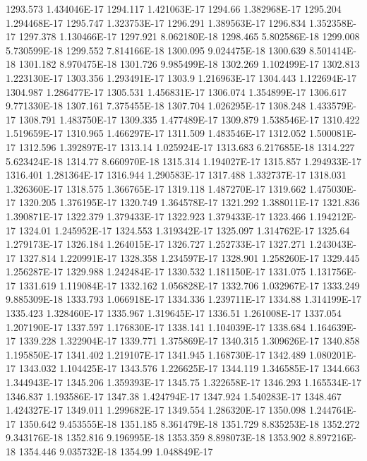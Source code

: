 1293.573  1.434046E-17
1294.117  1.421063E-17
1294.66  1.382968E-17
1295.204  1.294468E-17
1295.747  1.323753E-17
1296.291  1.389563E-17
1296.834  1.352358E-17
1297.378  1.130466E-17
1297.921  8.062180E-18
1298.465  5.802586E-18
1299.008  5.730599E-18
1299.552  7.814166E-18
1300.095  9.024475E-18
1300.639  8.501414E-18
1301.182  8.970475E-18
1301.726  9.985499E-18
1302.269  1.102499E-17
1302.813  1.223130E-17
1303.356  1.293491E-17
1303.9  1.216963E-17
1304.443  1.122694E-17
1304.987  1.286477E-17
1305.531  1.456831E-17
1306.074  1.354899E-17
1306.617  9.771330E-18
1307.161  7.375455E-18
1307.704  1.026295E-17
1308.248  1.433579E-17
1308.791  1.483750E-17
1309.335  1.477489E-17
1309.879  1.538546E-17
1310.422  1.519659E-17
1310.965  1.466297E-17
1311.509  1.483546E-17
1312.052  1.500081E-17
1312.596  1.392897E-17
1313.14  1.025924E-17
1313.683  6.217685E-18
1314.227  5.623424E-18
1314.77  8.660970E-18
1315.314  1.194027E-17
1315.857  1.294933E-17
1316.401  1.281364E-17
1316.944  1.290583E-17
1317.488  1.332737E-17
1318.031  1.326360E-17
1318.575  1.366765E-17
1319.118  1.487270E-17
1319.662  1.475030E-17
1320.205  1.376195E-17
1320.749  1.364578E-17
1321.292  1.388011E-17
1321.836  1.390871E-17
1322.379  1.379433E-17
1322.923  1.379433E-17
1323.466  1.194212E-17
1324.01  1.245952E-17
1324.553  1.319342E-17
1325.097  1.314762E-17
1325.64  1.279173E-17
1326.184  1.264015E-17
1326.727  1.252733E-17
1327.271  1.243043E-17
1327.814  1.220991E-17
1328.358  1.234597E-17
1328.901  1.258260E-17
1329.445  1.256287E-17
1329.988  1.242484E-17
1330.532  1.181150E-17
1331.075  1.131756E-17
1331.619  1.119084E-17
1332.162  1.056828E-17
1332.706  1.032967E-17
1333.249  9.885309E-18
1333.793  1.066918E-17
1334.336  1.239711E-17
1334.88  1.314199E-17
1335.423  1.328460E-17
1335.967  1.319645E-17
1336.51  1.261008E-17
1337.054  1.207190E-17
1337.597  1.176830E-17
1338.141  1.104039E-17
1338.684  1.164639E-17
1339.228  1.322904E-17
1339.771  1.375869E-17
1340.315  1.309626E-17
1340.858  1.195850E-17
1341.402  1.219107E-17
1341.945  1.168730E-17
1342.489  1.080201E-17
1343.032  1.104425E-17
1343.576  1.226625E-17
1344.119  1.346585E-17
1344.663  1.344943E-17
1345.206  1.359393E-17
1345.75  1.322658E-17
1346.293  1.165534E-17
1346.837  1.193586E-17
1347.38  1.424794E-17
1347.924  1.540283E-17
1348.467  1.424327E-17
1349.011  1.299682E-17
1349.554  1.286320E-17
1350.098  1.244764E-17
1350.642  9.453555E-18
1351.185  8.361479E-18
1351.729  8.835253E-18
1352.272  9.343176E-18
1352.816  9.196995E-18
1353.359  8.898073E-18
1353.902  8.897216E-18
1354.446  9.035732E-18
1354.99  1.048849E-17
